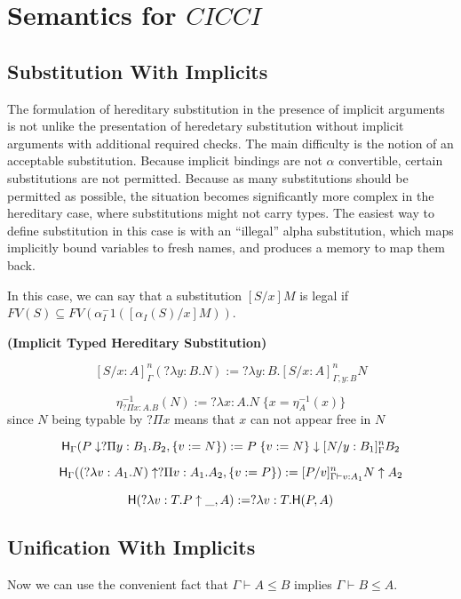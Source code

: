 \section{Semantics for $CICCI$}


\subsection{Substitution With Implicits}

The formulation of hereditary substitution in the presence of 
implicit arguments is not unlike the presentation of
heredetary substitution without implicit arguments with
additional required checks.
The main difficulty is the notion of an acceptable substitution. 
Because implicit bindings are not $\alpha$ convertible, 
certain substitutions are not permitted.  
Because as many substitutions should be permitted as possible, 
the situation becomes significantly more complex in the 
hereditary case, where substitutions might not carry types.  
The easiest way to define substitution in this case is with an ``illegal'' alpha substitution, 
which maps implicitly bound variables to fresh names, 
and produces a memory to map them back.

In this case, we can say that a substitution $[S/x] M$ is legal if 
$FV(S) \subseteq FV(\alpha_I^-1( [\alpha_I(S)/x] M) )$.

\begin{definition}
\textbf{(Implicit Typed Hereditary Substitution)}


\[
[S / x : A]^n_{\Gamma } (?\lambda y : B . N) := ?\lambda y:B . [S / x : A]^n_{\Gamma, y : B} N
\] 

\[
\eta^{-1}_{?\Pi x : A . B}(N) := ?\lambda x : A . N \; \{ x = \eta^{-1}_A(x) \}
\] since $N$ being typable by $?\Pi x $ means that $x$ can not appear free in $N$

\[
\mathsf{H}_{\Gamma}(P \downarrow ?\Pi y : B_1 . B_2 , \{ v := N \} ) := P\; \{ v := N \} \downarrow [N/y : B_1]^n_{\Gamma}B_2
\]

\[
\mathsf{H}_{\Gamma} ((?\lambda v : A_1 . N) \uparrow ?\Pi v : A_1 . A_2 , \{ v := P \}) 
:= [P/v]^n_{\Gamma \vdash v : A_1} N \uparrow A_2
\]

\[ 
\mathsf{H}(?\lambda v : T . P \uparrow \_ , A) := ?\lambda v : T . \mathsf{H}(P,A)
\]

\label{def:hered}
\end{definition}



\subsection{Unification With Implicits}

Now we can use the convenient fact that $\Gamma \vdash A  \leq B$ implies $\Gamma \vdash B \leq A$.
